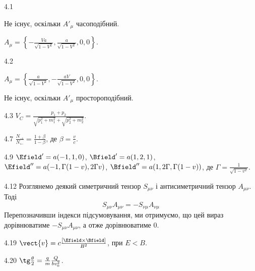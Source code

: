 \protect \section *{\protect {}}
\begin{Solution}{4.{1}}
	\begin{enumerate*}[label=\alph*)]
		\item Не існує, оскільки $A'_{\mu}$ часоподібний.
		\item $A_{\mu} = \left\lbrace -\frac{Va}{\sqrt{1-V^2}},\frac{a}{\sqrt{1-V^2}},0,0 \right\rbrace$.
	\end{enumerate*}
\end{Solution}
\begin{Solution}{4.{2}}
	\begin{enumerate*}[label=\alph*)]
		\item $A_{\mu} = \left\lbrace \frac{a}{\sqrt{1-V^2}},-\frac{aV}{\sqrt{1-V^2}},0,0 \right\rbrace$.
		\item Не існує, оскільки $A'_{\mu}$ простороподібний.
	\end{enumerate*}
\end{Solution}
\begin{Solution}{4.{3}}
	$V_C = \frac{p_1 + p_2}{\sqrt{p_1^2 + m_1^2} + \sqrt{p_2^2 + m_2^2}}$.
\end{Solution}
\begin{Solution}{4.{7}}
	$\frac{N_\rightarrow}{N_\leftarrow} = \frac{1+ \beta}{1-\beta}$, де $\beta = \frac{v}{c}$.
\end{Solution}
\begin{Solution}{4.{9}}
	$\Efield' = a(-1,1,0)$, $\Bfield' = a(1,2,1)$, $\Efield'' = a(-1,\Gamma(1- v),2\Gamma v)$, $\Bfield'' = a(1,2\Gamma,\Gamma(1- v))$, де $\Gamma = \frac{1}{\sqrt{1 - v^2}}$.
\end{Solution}
\begin{Solution}{4.{12}}
	Розглянемо деякий симетричний тензор $S_{\mu\nu}$ і антисиметричний тензор $A_{\mu\nu}$. Тоді
	\[
		S_{\mu\nu}A_{\mu\nu} = - S_{\nu\mu}A_{\nu\mu}
	\]
	Перепозначивши індекси підсумовування, ми отримуємо, що цей вираз дорівнюватиме $-S_{\mu\nu}A_{\mu\nu}$, а отже дорівнюватиме $0$.
\end{Solution}
\begin{Solution}{4.{19}}
	$\vect{v} = c \frac{\left[ \Efield\times\Bfield\right] }{B^2}$, при $E<B$.
\end{Solution}
\begin{Solution}{4.{20}}
	$\tg\frac{\theta}{2} = \frac qm \frac{Q}{bv_0^2}$.
\end{Solution}
